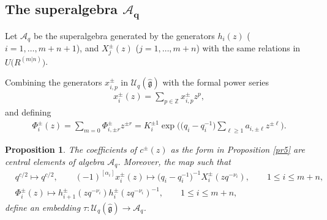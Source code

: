 \documentclass[10pt,a4paper]{amsart}
\numberwithin{equation}{section}
\newtheorem{Proposition}[Theorem]{Proposition}
 { \theoremstyle{definition}
\newtheorem{Definition}[Theorem]{Definition}
\newtheorem{Note}[Theorem]{Note}
\newtheorem{Example}[Theorem]{Example}
\newtheorem{Remark}[Theorem]{Remark} }
\begin{document}
\subsection[The superalgebra A\_q]{The superalgebra $\boldsymbol{\mathcal{A}_q}$}


\begin{Definition}
Let $\mathcal{A}_q$ be the superalgebra generated by the generators $h_i(z)$ ($i=1,\dots,\allowbreak m+n+1$), and $X_j^{\pm}(z)$ ($j=1,\dots,m+n$) with the same relations in $U\bigl(R^{(m|n)}\bigr) $.
\end{Definition}

Combining the generators $x_{i,p}^{\pm}$ in $\mathcal{U}_q(\mathfrak{\hat{g}})$ with the formal power series
\begin{gather*}
 x_i^{\pm}(z)=\sum_{p\in\mathbb{Z}}x_{i,p}^{\pm}z^{p},
\end{gather*}
and defining
\begin{gather}\label{homo2}
	\Phi^{\pm}_i(z)=\sum\limits_{m=0}\Phi_{i,\pm r}^{\pm}z^{\pm r}=K_i^{\pm 1} \exp\biggl(\bigl(q_i-q_i^{-1}\bigr)\sum\limits_{\ell\geq 1}a_{i,\pm \ell}z^{\pm \ell}\biggr).
\end{gather}




\begin{Proposition}\label{Apr0} The coefficients of
 $c^{\pm}(z)$ as the form in Proposition {\rm\ref{pr5}} are central elements of algebra $\mathcal{A}_q$. Moreover,
 the map such that
\begin{align*}
 &q^{c/2}\mapsto q^{c/2},\qquad
 (-1)^{[\alpha_i]} x_i^{\pm}(z)\mapsto\bigl(q_i-q_i^{-1}\bigr)^{-1}X_i^{\pm}(zq^{-\nu_i}),\qquad 1\leq i\leq m+n,\\
 &\Phi^{\pm}_{i}(z)\mapsto h_{i+1}^{\pm}(zq^{-\nu_i})h_{i}^{\pm}(zq^{-\nu_i})^{-1},\qquad 1\leq i\leq m+n,
\end{align*}
define an embedding $\tau\colon \mathcal{U}_q(\mathfrak{\hat{g}})\rightarrow\mathcal{A}_q$.
\end{Proposition}
\end{document}
